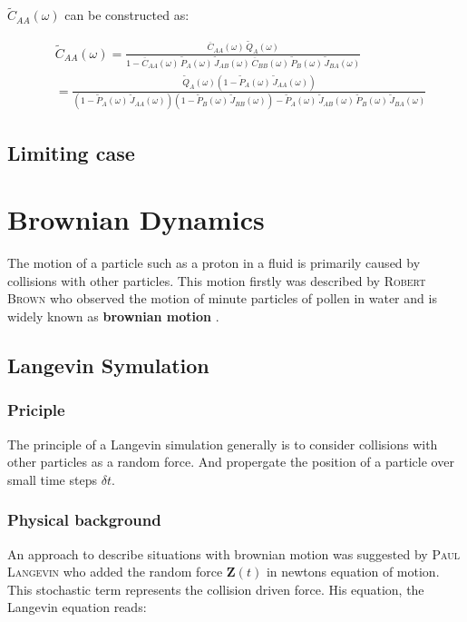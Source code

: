 \documentclass[a4paper, parskip=half]{scrartcl}
\newcommand{\person}[1]{%
	\textsc{#1}%
}
\newcommand{\effect}[1]{%
	\textbf{#1}%
}
\begin{document}
$\widetilde{C}_{AA}(\omega)$ can be constructed as:

\begin{align}
&\widetilde{C}_{AA}(\omega) = \frac{\overline{C}_{AA}(\omega) \, \widetilde{Q}_{A}(\omega)}{1-\overline{C}_{AA}(\omega)\, \widetilde{P}_A(\omega)\, \widetilde{J}_{AB}(\omega)\, \overline{C}_{BB}(\omega)\, \widetilde{P}_B(\omega)\,\widetilde{J}_{BA}(\omega)}\\
&= \frac{\widetilde{Q}_A(\omega)\left(1 - \widetilde{P}_A(\omega)\, \widetilde{J}_{AA}(\omega) \right)}{\left(1 - \widetilde{P}_A(\omega)\, \widetilde{J}_{AA}(\omega) \right)\left(1 - \widetilde{P}_B(\omega)\, \widetilde{J}_{BB}(\omega) \right) - \widetilde{P}_A(\omega)\, \widetilde{J}_{AB}(\omega)\, \widetilde{P}_B(\omega)\, \widetilde{J}_{BA}(\omega)}
\end{align}
\subsection{Limiting case}

\newpage
\section{Brownian Dynamics}
The motion of a particle such as a proton in a fluid is primarily  caused by collisions with other particles. This motion firstly was described by \person{Robert Brown} who observed the motion of minute particles of pollen in water and is widely known as \effect{brownian motion}.
\subsection{Langevin Symulation}
\subsubsection{Priciple}
The principle of a Langevin simulation generally is to consider collisions with other particles as a random force. And propergate the position of a particle over small time steps $\delta t$.
\subsubsection{Physical background}
An approach to describe situations with brownian motion was suggested by \person{Paul Langevin} who added the random force $\mathbf{Z}(t)$ in newtons equation of motion. This stochastic term represents the collision driven force. His equation, the Langevin equation reads:
\end{document}
